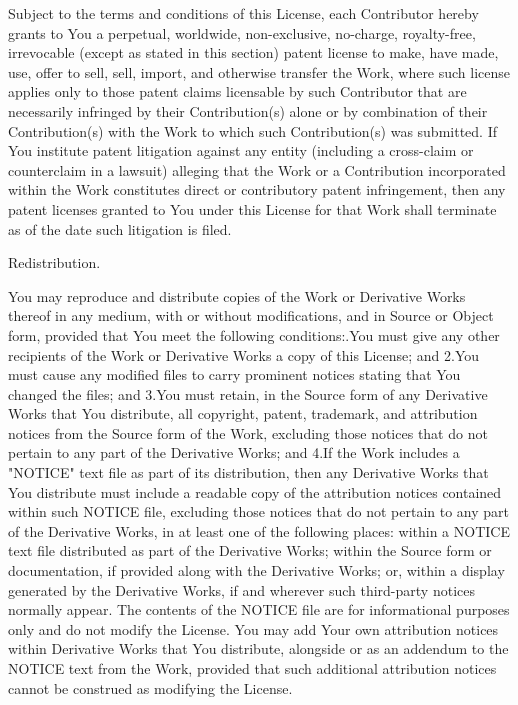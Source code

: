 Subject to the terms and conditions of this License, each Contributor hereby grants to You a perpetual, worldwide, non-\/exclusive, no-\/charge, royalty-\/free, irrevocable (except as stated in this section) patent license to make, have made, use, offer to sell, sell, import, and otherwise transfer the Work, where such license applies only to those patent claims licensable by such Contributor that are necessarily infringed by their Contribution(s) alone or by combination of their Contribution(s) with the Work to which such Contribution(s) was submitted. If You institute patent litigation against any entity (including a cross-\/claim or counterclaim in a lawsuit) alleging that the Work or a Contribution incorporated within the Work constitutes direct or contributory patent infringement, then any patent licenses granted to You under this License for that Work shall terminate as of the date such litigation is filed.


\begin{DoxyEnumerate}
\item Redistribution.
\end{DoxyEnumerate}

You may reproduce and distribute copies of the Work or Derivative Works thereof in any medium, with or without modifications, and in Source or Object form, provided that You meet the following conditions:.\+You must give any other recipients of the Work or Derivative Works a copy of this License; and 2.\+You must cause any modified files to carry prominent notices stating that You changed the files; and 3.\+You must retain, in the Source form of any Derivative Works that You distribute, all copyright, patent, trademark, and attribution notices from the Source form of the Work, excluding those notices that do not pertain to any part of the Derivative Works; and 4.\+If the Work includes a "{}\+NOTICE"{} text file as part of its distribution, then any Derivative Works that You distribute must include a readable copy of the attribution notices contained within such NOTICE file, excluding those notices that do not pertain to any part of the Derivative Works, in at least one of the following places:\+ within a NOTICE text file distributed as part of the Derivative Works; within the Source form or documentation, if provided along with the Derivative Works; or, within a display generated by the Derivative Works, if and wherever such third-\/party notices normally appear. The contents of the NOTICE file are for informational purposes only and do not modify the License. You may add Your own attribution notices within Derivative Works that You distribute, alongside or as an addendum to the NOTICE text from the Work, provided that such additional attribution notices cannot be construed as modifying the License.

